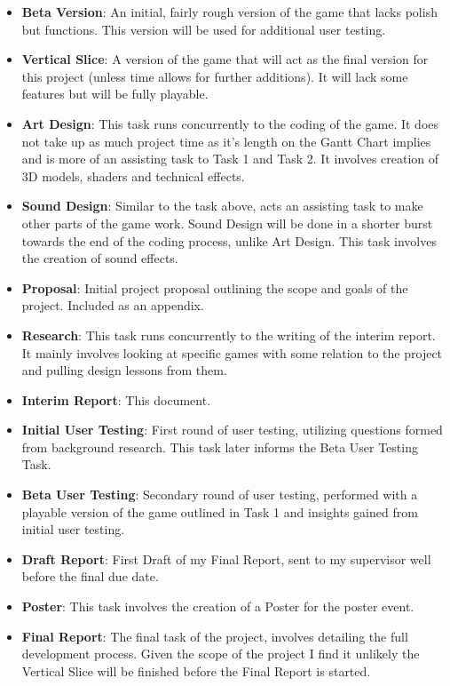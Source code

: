 \documentclass{report}
\begin{document}
\begin{itemize}
  \item \textbf{Beta Version}: An initial, fairly rough version of the game that lacks polish but functions. This version will be used for additional user testing.
  \item \textbf{Vertical Slice}: A version of the game that will act as the final version for this project (unless time allows for further additions). It will lack some features but will be fully playable.
  \item \textbf{Art Design}: This task runs concurrently to the coding of the game. It does not take up as much project time as it's length on the Gantt Chart implies and is more of an assisting task to Task 1 and Task 2. It involves creation of 3D models, shaders and technical effects.
  \item \textbf{Sound Design}: Similar to the task above, acts an assisting task to make other parts of the game work. Sound Design will be done in a shorter burst towards the end of the coding process, unlike Art Design. This task involves the creation of sound effects.
  \item \textbf{Proposal}: Initial project proposal outlining the scope and goals of the project. Included as an appendix.
  \item \textbf{Research}: This task runs concurrently to the writing of the interim report. It mainly involves looking at specific games with some relation to the project and pulling design lessons from them.
  \item \textbf{Interim Report}: This document.
  \item \textbf{Initial User Testing}: First round of user testing, utilizing questions formed from background research. This task later informs the Beta User Testing Task.
  \item \textbf{Beta User Testing}: Secondary round of user testing, performed with a playable version of the game outlined in Task 1 and insights gained from initial user testing.
  \item \textbf{Draft Report}: First Draft of my Final Report, sent to my supervisor well before the final due date.
  \item \textbf{Poster}: This task involves the creation of a Poster for the poster event. 
  \item \textbf{Final Report}: The final task of the project, involves detailing the full development process. Given the scope of the project I find it unlikely the Vertical Slice will be finished before the Final Report is started.
\end{itemize}
\end{document}

